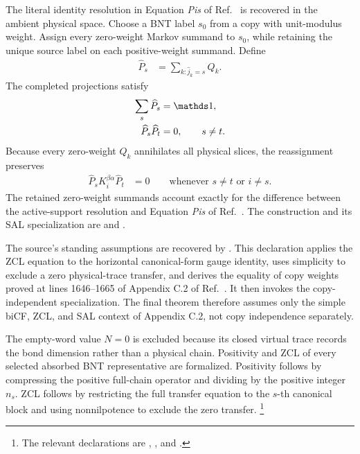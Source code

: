 \documentclass{article}
\begin{document}
The literal identity resolution in Equation \emph{Pis} of
Ref.~\cite{Cirac2016MPDO_arXiv} is recovered in the ambient physical space.
Choose a BNT label $s_0$ from a copy with unit-modulus weight. Assign every
zero-weight Markov summand to $s_0$, while retaining the unique source label on
each positive-weight summand. Define
\begin{align}
    \widehat P_s
        &=
        \sum_{k:\widehat j_k=s}Q_k.
    \label{eq:cpgsv17_mpdo_sal_zcl_eta_local_structure_completed_projection}
\end{align}
The completed projections satisfy
\begin{align}
    \sum_s\widehat P_s
        &=\Id,
    \label{eq:cpgsv17_mpdo_sal_zcl_eta_local_structure_completed_identity_resolution}\\
    \widehat P_s\widehat P_t
        &=0,
        \qquad s\neq t.
    \label{eq:cpgsv17_mpdo_sal_zcl_eta_local_structure_completed_projection_orthogonality}
\end{align}
Because every zero-weight $Q_k$ annihilates all physical slices, the
reassignment preserves
\begin{align}
    \widehat P_s K_i^{\beta\alpha}\widehat P_t
        &=0
        \qquad
        \text{whenever }s\neq t\text{ or }i\neq s.
    \label{eq:cpgsv17_mpdo_sal_zcl_eta_local_structure_completed_slice_vanishing}
\end{align}
The retained zero-weight summands account exactly for the difference between
the active-support resolution and Equation \emph{Pis} of
Ref.~\cite{Cirac2016MPDO_arXiv}. The construction and its SAL specialization
are
 and
.

The source's standing assumptions are recovered by
.
This declaration applies the ZCL equation to the horizontal canonical-form
gauge identity, uses simplicity to exclude a zero physical-trace transfer, and
derives the equality of copy weights proved at lines 1646--1665 of Appendix
C.2 of Ref.~\cite{Cirac2016MPDO_arXiv}. It then invokes the copy-independent
specialization. The final theorem therefore assumes only the simple biCF, ZCL,
and SAL context of Appendix C.2, not copy independence separately.

The empty-word value $N=0$ is excluded because its closed virtual trace records
the bond dimension rather than a physical chain. Positivity and ZCL of every
selected absorbed BNT representative are formalized. Positivity follows by
compressing the positive full-chain operator and dividing by the positive
integer $n_s$. ZCL follows by restricting the full transfer equation to the
$s$-th canonical block and using nonnilpotence to exclude the zero transfer.
\footnote{The relevant declarations are
,
,
and
.}
\end{document}

